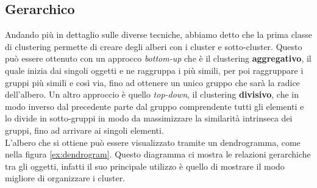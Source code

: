 \documentclass{llncs}
\newcommand{\acapo}{\vspace{0.5\baselineskip}\\}
\begin{document}
	\subsection{Gerarchico}
	Andando più in dettaglio sulle diverse tecniche, abbiamo detto che la prima classe di clustering permette di creare degli alberi con i cluster e sotto-cluster. 
	Questo può essere ottenuto con un approcco \textit{bottom-up} che è il clustering \textbf{aggregativo},
	il quale inizia dai singoli oggetti e ne raggruppa i più simili, per poi raggruppare i gruppi più simili e così via, fino ad ottenere un unico gruppo
	che sarà la radice dell'albero. Un altro approccio è quello \textit{top-down}, il clustering \textbf{divisivo}, che in modo inverso dal precedente parte 
	dal gruppo comprendente tutti gli elementi e lo divide in sotto-gruppi in modo da massimizzare la similarità intrinseca dei gruppi, 
	fino ad arrivare ai singoli elementi.
	\acapo
	L'albero che si ottiene può essere visualizzato tramite un dendrogramma, come nella figura \ref{ex:dendrogram}.
	Questo diagramma ci mostra le relazioni gerarchiche tra gli oggetti, infatti il suo principale utilizzo è quello di 
	mostrare il modo migliore di organizzare i cluster. 
	\clearpage
\end{document}
